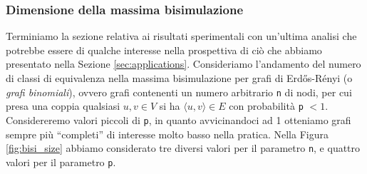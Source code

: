 \subsubsection{Dimensione della massima bisimulazione}
Terminiamo la sezione relativa ai risultati sperimentali con un'ultima analisi che potrebbe essere di qualche interesse nella prospettiva di ciò che abbiamo presentato nella Sezione \ref{sec:applications}. Consideriamo l'andamento del numero di classi di equivalenza nella massima bisimulazione per grafi di Erdős-Rényi (o \emph{grafi binomiali}), ovvero grafi contenenti un numero arbitrario \verb|n| di nodi, per cui presa una coppia qualsiasi $u,v \in V$ si ha $\langle u,v\rangle \in E$ con probabilità \verb|p| $< 1$.
Considereremo valori piccoli di \verb|p|, in quanto avvicinandoci ad 1 otteniamo grafi sempre più ``completi'' di interesse molto basso nella pratica. Nella Figura \ref{fig:bisi_size} abbiamo considerato tre diversi valori per il parametro \verb|n|, e quattro valori per il parametro \verb|p|.

